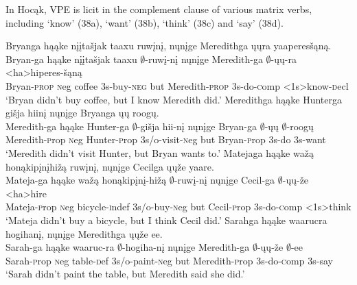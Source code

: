 \documentclass[output=paper]{LSP/langsci}
\begin{document}
In Hoc\k{a}k, VPE is licit in the complement clause of various matrix verbs, including `know' (38a), `want' (38b), `think' (38c) and `say' (38d).


\begin{exe}
\ex
\begin{xlist}
\ex
\glll Bryanga h\k{a}\k{a}ke {n\k{i}\k{i}ta\v{s}jak taaxu} ruw\k{i}n\k{i}, n\k{u}n\k{i}ge Meredithga \k{u}\k{u}ra yaaperes\v{s}\k{a}n\k{a}.\\
Bryan-ga h\k{a}\k{a}ke {n\k{i}\k{i}ta\v{s}jak taaxu} $\emptyset$-ruw\k{i}-n\k{i} n\k{u}n\k{i}ge Meredith-ga $\emptyset$-\k{u}\k{u}-ra <ha>hiperes-\v{s}\k{a}n\k{a}\\
Bryan-\textsc{prop} {\textsc neg} coffee {\textsc 3s}-buy-\textsc{neg} but Meredith-\textsc{prop} {\textsc 3s}-do-{\textsc comp} <{\textsc 1s}>know-{\textsc decl}\\
\trans `Bryan didn't buy coffee, but I know Meredith did.'
\ex
\glll Meredithga h\k{a}\k{a}ke Hunterga {gi\v{s}ja hiin\k{i}} n\k{u}n\k{i}ge Bryanga \k{u}\k{u} roog\k{u}.\\
Meredith-ga h\k{a}\k{a}ke Hunter-ga $\emptyset$-{gi\v{s}ja hii-n\k{i}} n\k{u}n\k{i}ge Bryan-ga $\emptyset$-\k{u}\k{u} $\emptyset$-roog\k{u}\\
Meredith-{\textsc prop} {\textsc neg} Hunter-{\textsc prop} {\textsc 3s/o}-visit-{\textsc neg} but Bryan-{\textsc prop} {\textsc 3s}-do {\textsc 3s}-want\\
\trans `Meredith didn't visit Hunter, but Bryan wants to.'
\ex
\glll Matejaga h\k{a}\k{a}ke {wa\v{z}\k{a} hon\k{a}kip\k{i}n\k{i}hi\v{z}\k{a}} ruw\k{i}n\k{i}, n\k{u}n\k{i}ge Cecilga \k{u}\k{u}\v{z}e yaare.\\
Mateja-ga h\k{a}\k{a}ke {wa\v{z}\k{a} hon\k{a}kip\k{i}n\k{i}-hi\v{z}\k{a}} $\emptyset$-ruw\k{i}-n\k{i} n\k{u}n\k{i}ge Cecil-ga $\emptyset$-\k{u}\k{u}-\v{z}e <ha>hire\\
Mateja-{\textsc prop} {\textsc neg} bicycle-{\textsc indef} {\textsc 3s/o}-buy-{\textsc neg} but Cecil-{\textsc prop} {\textsc 3s}-do-{\textsc comp} <{\textsc 1s}>think\\
\trans `Mateja didn't buy a bicycle, but I think Cecil did.'
\ex
\glll Sarahga h\k{a}\k{a}ke waarucra hogihan\k{i}, n\k{u}n\k{i}ge Meredithga \k{u}\k{u}\v{z}e ee.\\
Sarah-ga h\k{a}\k{a}ke waaruc-ra $\emptyset$-hogiha-n\k{i} n\k{u}n\k{i}ge Meredith-ga $\emptyset$-\k{u}\k{u}-\v{z}e $\emptyset$-ee\\
Sarah-{\textsc prop} {\textsc neg} table-{\textsc def} {\textsc 3s/o}-paint-{\textsc neg} but Meredith-{\textsc prop} {\textsc 3s}-do-{\textsc comp} {\textsc 3s}-say\\
\trans `Sarah didn't paint the table, but Meredith said she did.'
\end{xlist}
\end{exe}
\end{document}
